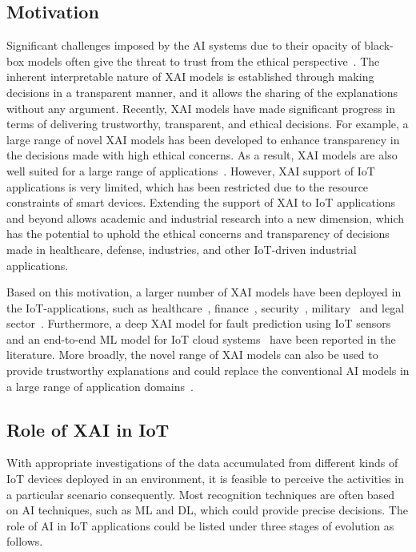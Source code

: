 \documentclass[journal]{IEEEtran}
\begin{document}
\subsection{Motivation}

Significant challenges imposed by the AI systems due to their opacity of black-box models often give the threat to trust from the ethical perspective~\cite{jacovi2021formalizing}. The inherent interpretable nature of XAI models is established through making decisions in a transparent manner, and it allows the sharing of the explanations without any argument. Recently, XAI models have made significant progress in terms of delivering trustworthy, transparent, and ethical decisions. For example, a large range of novel XAI models has been developed to enhance transparency in the decisions made with high ethical concerns. As a result, XAI models are also well suited for a large range of applications~\cite{gunning2019darpa}. However, XAI support of IoT applications is very limited, which has been restricted due to the resource constraints of smart devices. Extending the support of XAI to IoT applications and beyond allows academic and industrial research into a new dimension, which has the potential to uphold the ethical concerns and transparency of decisions made in healthcare, defense, industries, and other IoT-driven industrial applications.

Based on this motivation, a larger number of XAI models have been deployed in the IoT-applications, such as healthcare~\cite{nazar2021systematic}, finance~\cite{kute2021deep}, security~\cite{zolanvari2021trust}, military~\cite{warren2020friend} and legal sector~\cite{deeks2019judicial}. Furthermore, a deep XAI model for fault prediction using IoT sensors~\cite{mansouri2022deep} and an end-to-end ML model for IoT cloud systems~\cite{nguyen2021holistic} have been reported in the literature. More broadly, the novel range of XAI models can also be used to provide trustworthy explanations and could replace the conventional AI models in a large range of application domains~\cite{jagatheesaperumal2021duo}.



\subsection{Role of XAI in IoT}
With appropriate investigations of the data accumulated from different kinds of IoT devices deployed in an environment, it is feasible to perceive the activities in a particular scenario consequently. Most recognition techniques are often based on AI techniques, such as ML and DL, which could provide precise decisions. The role of AI in IoT applications could be listed under three stages of evolution as follows.
\end{document}
